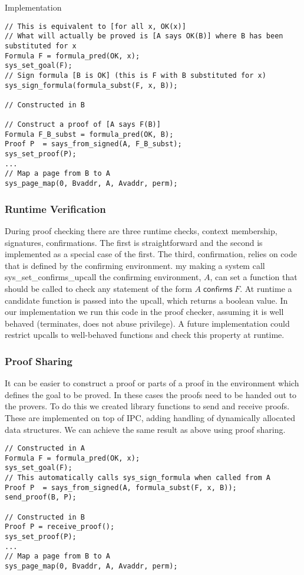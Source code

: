 \documentclass[10pt]{article}
\newcommand{\confirms}[2]{\ensuremath{#1\;\textsf{confirms}\;#2}}
\begin{document}
\begin{section}{Implementation}
\begin{lstlisting}
// This is equivalent to [for all x, OK(x)]
// What will actually be proved is [A says OK(B)] where B has been substituted for x
Formula F = formula_pred(OK, x);
sys_set_goal(F);
// Sign formula [B is OK] (this is F with B substituted for x)
sys_sign_formula(formula_subst(F, x, B));

// Constructed in B

// Construct a proof of [A says F(B)]
Formula F_B_subst = formula_pred(OK, B);
Proof P  = says_from_signed(A, F_B_subst);
sys_set_proof(P);
...
// Map a page from B to A
sys_page_map(0, Bvaddr, A, Avaddr, perm);
\end{lstlisting}
\subsubsection{Runtime Verification}
During proof checking there are three runtime checks, context membership, signatures, confirmations.  The first is straightforward and the second is implemented as a special case of the first.  The third, confirmation, relies on code that is defined by the confirming environment.  my making a system call \textsf{sys\_set\_confirms\_upcall} the confirming environment, $A$, can set a function that should be called to check any statement of the form $\confirms{A}{F}$.  At runtime a candidate function is passed into the upcall, which returns a boolean value.  In our implementation we run this code in the proof checker, assuming it is well behaved (terminates, does not abuse privilege).  A future implementation could restrict upcalls to well-behaved functions and check this property at runtime.
\subsubsection{Proof Sharing}
It can be easier to construct a proof or parts of a proof in the environment which defines the goal to be proved.  In these cases the proofs need to be handed out to the provers.  To do this we created library functions to send and receive proofs.  These are implemented on top of IPC, adding handling of dynamically allocated data structures.  We can achieve the same result as above using proof sharing.
\begin{lstlisting}
// Constructed in A
Formula F = formula_pred(OK, x);
sys_set_goal(F);
// This automatically calls sys_sign_formula when called from A
Proof P  = says_from_signed(A, formula_subst(F, x, B));
send_proof(B, P);

// Constructed in B
Proof P = receive_proof();
sys_set_proof(P);
...
// Map a page from B to A
sys_page_map(0, Bvaddr, A, Avaddr, perm);
\end{lstlisting}
\end{section}
\end{document}
